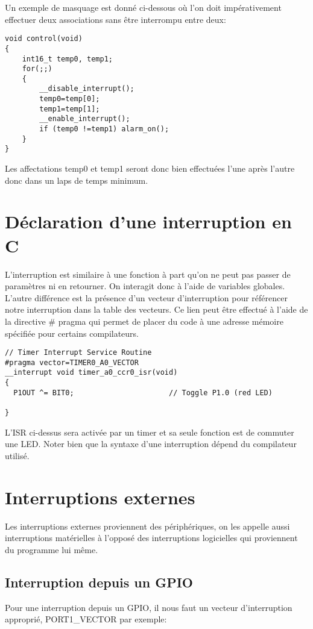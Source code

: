 Un exemple de masquage est donné ci-dessous où l'on doit impérativement effectuer deux associations sans être interrompu entre deux:

\lstset{style=customc}
\begin{lstlisting}
void control(void)
{
    int16_t temp0, temp1;
    for(;;)
    {
        __disable_interrupt();
        temp0=temp[0];
        temp1=temp[1];
        __enable_interrupt();
        if (temp0 !=temp1) alarm_on();
    }
}
\end{lstlisting}

Les affectations temp0 et temp1 seront donc bien effectuées l'une après l'autre donc dans un laps de temps minimum.

\section{Déclaration d'une interruption en C}
L'interruption est similaire à une fonction à part qu'on ne peut pas passer de paramètres ni en retourner. On interagit donc à l'aide de variables globales. L'autre différence est la présence d'un vecteur d'interruption pour référencer notre interruption dans la table des vecteurs. Ce lien peut être effectué à l'aide de la directive \# pragma qui permet de placer du code à une adresse mémoire spécifiée pour certains compilateurs.

\lstset{style=customc}
\begin{lstlisting}
// Timer Interrupt Service Routine
#pragma vector=TIMER0_A0_VECTOR
__interrupt void timer_a0_ccr0_isr(void)
{
  P1OUT ^= BIT0;                      // Toggle P1.0 (red LED)
 
}
\end{lstlisting}

L'ISR ci-dessus sera activée par un timer et sa seule fonction est de commuter une LED. Noter bien que la syntaxe d'une interruption dépend du compilateur utilisé.

\section{Interruptions externes}
Les interruptions externes proviennent des périphériques, on les appelle aussi interruptions matérielles à l'opposé des interruptions logicielles qui proviennent du programme lui même.

\subsection{Interruption depuis un GPIO}
Pour une interruption depuis un GPIO, il nous faut un vecteur d'interruption approprié, PORT1\_VECTOR par exemple:

